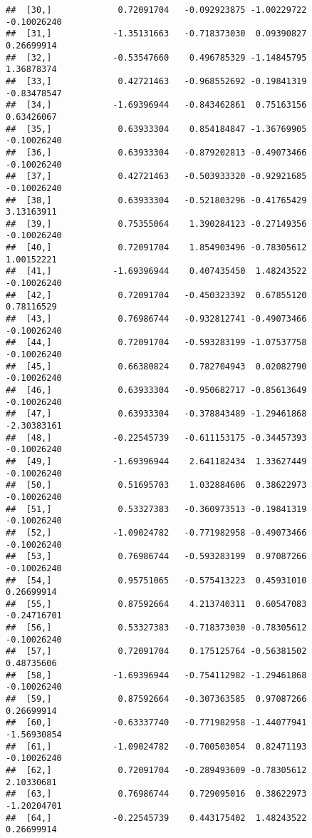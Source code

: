\documentclass[
]{article}
\begin{document}
\begin{verbatim}
##  [30,]             0.72091704   -0.092923875 -1.00229722    -0.10026240
##  [31,]            -1.35131663   -0.718373030  0.09390827     0.26699914
##  [32,]            -0.53547660    0.496785329 -1.14845795     1.36878374
##  [33,]             0.42721463   -0.968552692 -0.19841319    -0.83478547
##  [34,]            -1.69396944   -0.843462861  0.75163156     0.63426067
##  [35,]             0.63933304    0.854184847 -1.36769905    -0.10026240
##  [36,]             0.63933304   -0.879202813 -0.49073466    -0.10026240
##  [37,]             0.42721463   -0.503933320 -0.92921685    -0.10026240
##  [38,]             0.63933304   -0.521803296 -0.41765429     3.13163911
##  [39,]             0.75355064    1.390284123 -0.27149356    -0.10026240
##  [40,]             0.72091704    1.854903496 -0.78305612     1.00152221
##  [41,]            -1.69396944    0.407435450  1.48243522    -0.10026240
##  [42,]             0.72091704   -0.450323392  0.67855120     0.78116529
##  [43,]             0.76986744   -0.932812741 -0.49073466    -0.10026240
##  [44,]             0.72091704   -0.593283199 -1.07537758    -0.10026240
##  [45,]             0.66380824    0.782704943  0.02082790    -0.10026240
##  [46,]             0.63933304   -0.950682717 -0.85613649    -0.10026240
##  [47,]             0.63933304   -0.378843489 -1.29461868    -2.30383161
##  [48,]            -0.22545739   -0.611153175 -0.34457393    -0.10026240
##  [49,]            -1.69396944    2.641182434  1.33627449    -0.10026240
##  [50,]             0.51695703    1.032884606  0.38622973    -0.10026240
##  [51,]             0.53327383   -0.360973513 -0.19841319    -0.10026240
##  [52,]            -1.09024782   -0.771982958 -0.49073466    -0.10026240
##  [53,]             0.76986744   -0.593283199  0.97087266    -0.10026240
##  [54,]             0.95751065   -0.575413223  0.45931010     0.26699914
##  [55,]             0.87592664    4.213740311  0.60547083    -0.24716701
##  [56,]             0.53327383   -0.718373030 -0.78305612    -0.10026240
##  [57,]             0.72091704    0.175125764 -0.56381502     0.48735606
##  [58,]            -1.69396944   -0.754112982 -1.29461868    -0.10026240
##  [59,]             0.87592664   -0.307363585  0.97087266     0.26699914
##  [60,]            -0.63337740   -0.771982958 -1.44077941    -1.56930854
##  [61,]            -1.09024782   -0.700503054  0.82471193    -0.10026240
##  [62,]             0.72091704   -0.289493609 -0.78305612     2.10330681
##  [63,]             0.76986744    0.729095016  0.38622973    -1.20204701
##  [64,]            -0.22545739    0.443175402  1.48243522     0.26699914

\end{verbatim}
\end{document}
